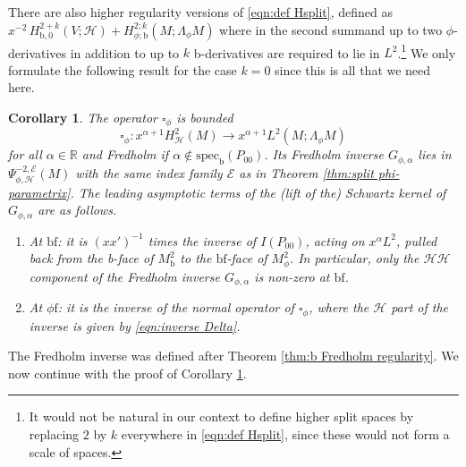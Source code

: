 \documentclass[11pt]{article}
\numberwithin{equation}{section}
\theoremstyle{plain}
\newtheorem{Cor}[Th]{Corollary}
\theoremstyle{definition}
\newcommand{\R}{{\mathbb{R}}}
\newcommand\calE{{\mathcal E}}
\newcommand{\phif}{{\phi\mathrm{f}}}
\newcommand{\bb}{{\mathrm{b}}}
\newcommand{\bbf}{{\mathrm{bf}}}
\newcommand{\specb}{\mathrm{spec}_\bb}
\newcommand{\Hsplit}{H_{\mathscr{H}}}
\begin{document}
There are also higher regularity versions of \eqref{eqn:def Hsplit}, defined as $x^{-2}\,H^{2+k}_{\bb,0}(V;\mathscr{H}) + H^{2;k}_{\phi;\bb}(M; \Lambda_\phi M)$ where in the second summand up to two $\phi$-derivatives in addition to up to $k$ b-derivatives are required to lie in $L^2$.\footnote{It would not be natural in our context to define higher split spaces by replacing $2$ by $k$ everywhere in \eqref{eqn:def Hsplit}, since these would not form a scale of spaces.}
We only formulate the following result for the case $k=0$ since this is all that we need here.

\begin{Cor} \label{cor:grihun fredholm inverse}
The operator $\square_\phi$ is bounded\vspace*{-3pt}
\begin{equation}
\label{eqn:box cphi bounded}
\square_{\phi}: x^{\alpha+1} \Hsplit^2(M) \to x^{\alpha+1} L^2 (M; \Lambda_\phi M)
\end{equation}
for all $\alpha\in\R$ and Fredholm if $\alpha\not\in \specb(P_{00})$.
Its Fredholm inverse $G_{\phi,\alpha}$ lies in $\Psi^{-2,\calE}_{\phi, \mathscr{H}}(M)$
with the same index family $\calE$ as in Theorem \ref{thm:split phi-parametrix}.
The leading asymptotic terms of the (lift of the) Schwartz kernel of $G_{\phi,\alpha}$ are as follows.

\begin{enumerate}
\item
At $\bbf$: it is
$(xx')^{-1}$ times the inverse of $I(P_{00})$, acting on $x^\alpha L^2$, pulled back from the
b-face of $M^2_\bb$ to the $\bbf$-face of $M^2_\phi$. In particular, only the
$\mathscr{H}\mathscr{H}$ component of the Fredholm inverse $G_{\phi,\alpha}$ is non-zero at $\bbf$.

\item
At $\phif$: it is the inverse of the normal operator of $\square_{\phi}$, where the $\mathscr{H}$ part of the inverse is given by \eqref{eqn:inverse Delta}.
\end{enumerate}
\end{Cor}

The Fredholm inverse was defined after Theorem \ref{thm:b Fredholm regularity}.
We now continue with the proof of Corollary \ref{cor:grihun fredholm inverse}.
\end{document}
